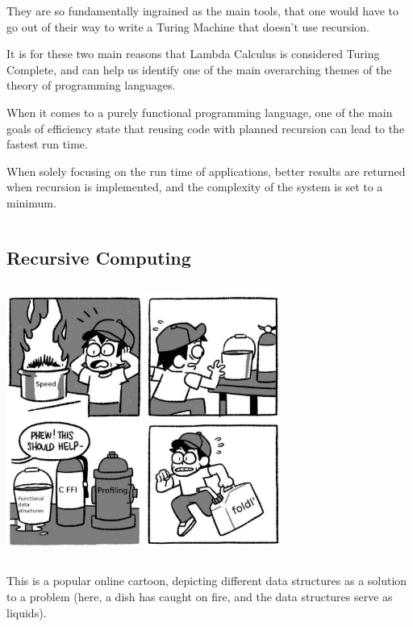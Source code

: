 \documentclass{article}
\begin{document}
\medskip\noindent
They are so fundamentally ingrained as the main tools, that one would have to go out of their way to write a Turing Machine that doesn't use recursion. 

\medskip\noindent
It is for these two main reasons that Lambda Calculus is considered Turing Complete, and can help us identify one of the main overarching themes of the theory of programming languages.

\medskip\noindent
When it comes to a purely functional programming language, one of the main goals of efficiency state that reusing code with planned recursion can lead to the fastest run time. 

\medskip\noindent
When solely focusing on the run time of applications, better results are returned when recursion is implemented, and the complexity of the system is set to a minimum.

\medskip\medskip
\begin{lstlisting}
\end{lstlisting}

\medskip

\subsection{Recursive Computing}
\medskip\medskip
\hspace{\parindent} 

\medskip\begin{center}
\includegraphics[width=9cm, height=9cm]{meme.png}
\end{center}

\medskip\noindent
This is a popular online cartoon, depicting different data structures as a solution to a problem (here, a dish has caught on fire, and the data structures serve as liquids)\cite{PM}.
\end{document}
